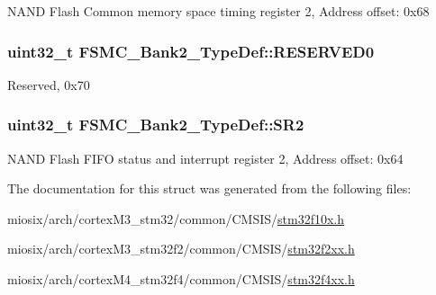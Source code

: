N\-A\-N\-D Flash Common memory space timing register 2, Address offset\-: 0x68 \hypertarget{struct_f_s_m_c___bank2___type_def_ac0433330a92f2bd04812384f63bb4a52}{
\subsubsection[{R\-E\-S\-E\-R\-V\-E\-D0}]{\setlength{\rightskip}{0pt plus 5cm}uint32\-\_\-t F\-S\-M\-C\-\_\-\-Bank2\-\_\-\-Type\-Def\-::\-R\-E\-S\-E\-R\-V\-E\-D0}}\label{struct_f_s_m_c___bank2___type_def_ac0433330a92f2bd04812384f63bb4a52}
Reserved, 0x70 \hypertarget{struct_f_s_m_c___bank2___type_def_a38ad7403e05c899dc266cf47f932cc8f}{
\subsubsection[{S\-R2}]{ uint32\-\_\-t F\-S\-M\-C\-\_\-\-Bank2\-\_\-\-Type\-Def\-::\-S\-R2}}\label{struct_f_s_m_c___bank2___type_def_a38ad7403e05c899dc266cf47f932cc8f}
N\-A\-N\-D Flash F\-I\-F\-O status and interrupt register 2, Address offset\-: 0x64 

The documentation for this struct was generated from the following files\-:\begin{DoxyCompactItemize}
\item 
miosix/arch/cortex\-M3\-\_\-stm32/common/\-C\-M\-S\-I\-S/\hyperlink{stm32f10x_8h}{stm32f10x.\-h}\item 
miosix/arch/cortex\-M3\-\_\-stm32f2/common/\-C\-M\-S\-I\-S/\hyperlink{stm32f2xx_8h}{stm32f2xx.\-h}\item 
miosix/arch/cortex\-M4\-\_\-stm32f4/common/\-C\-M\-S\-I\-S/\hyperlink{stm32f4xx_8h}{stm32f4xx.\-h}\end{DoxyCompactItemize}
